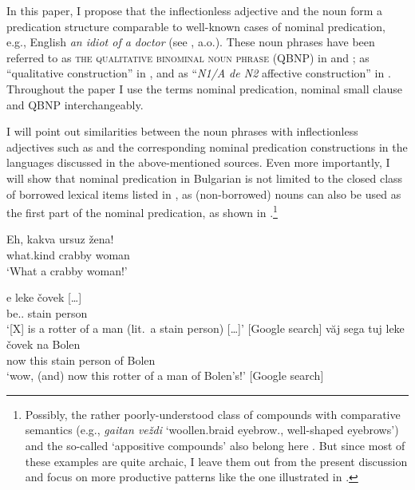 \documentclass[output=paper]{langscibook}
\begin{document}
In this paper, I propose that the inflectionless adjective and the noun form a predication structure comparable to well-known cases of nominal predication, e.g., English \emph{an idiot of a doctor} (see \citealt{Napoli1989,Kayne1994,denDikkenLiptak1997,HulkTellier2000,DoetjesRooryck2003,Casillas2003,denDikken2006,VillalbaBartra-Kaufman2010}, a.o.). These noun phrases have been referred to as \textsc{the qualitative binominal noun phrase} (QBNP) in \citet{denDikken2006} and \citet{VillalbaBartra-Kaufman2010}; as ``qualitative construction'' in \citet{DoetjesRooryck2003}, and as ``\emph{N1/A de N2} affective construction'' in \citet{Casillas2003}. Throughout the paper I use the terms nominal predication, nominal small clause and QBNP interchangeably. 

I will point out similarities between the noun phrases with inflectionless adjectives such as  and the corresponding nominal predication constructions in the languages discussed in the above-mentioned sources. Even more importantly, I will show that nominal predication in Bulgarian is not limited to the closed class of borrowed lexical items listed in , as (non-borrowed) nouns can also be used as the first part of the nominal predication, as shown in  .\footnote{Possibly, the rather poorly-understood class of compounds with comparative semantics (e.g., \emph{gaitan ve\v{z}di} `woollen.braid eyebrow.\Pl{}, well-shaped eyebrows') and the so-called `appositive compounds' also belong here \citep[see][]{Bagasheva2017}. But since most of these examples are quite archaic, I leave them out from the present discussion and focus on more productive patterns like the one illustrated in .} 

\ea \label{ge-ex-excl1-a}
\gll Eh, kakva ursuz \v{z}ena!\\
\Prt{} what.kind crabby woman\\
\glt `What a crabby woman!'
\z

\ea \label{ge-ex-stain1}
\ea
\gll [\ldots{}] e leke \v{c}ovek [\ldots{}] \\ 
{} be.\Prs{}.\Tsg{} stain person {}\\
\glt `[X] is a rotter of a man (lit.\ a stain person) [\ldots{}]' \hfill [Google search] 
\ex
\gll v\u{a}j sega tuj leke \v{c}ovek na Bolen\\
\Prt{} now this stain person of Bolen\\
\glt `wow, (and) now this rotter of a man of Bolen's!' \hfill [Google search] 
\z 
\z
\end{document}
